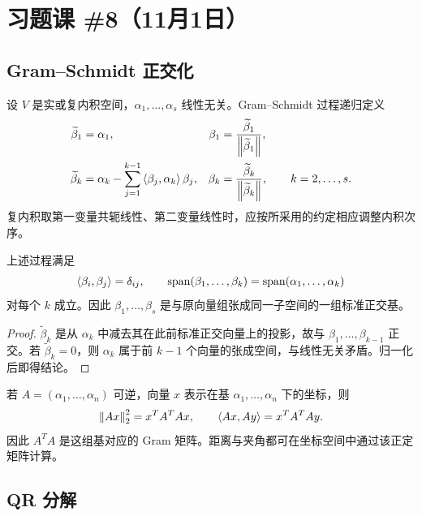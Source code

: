 \section{习题课 \#8（11月1日）}

\subsection{Gram--Schmidt 正交化}

设 $V$ 是实或复内积空间，$\alpha_1,\ldots,\alpha_s$ 线性无关。Gram--Schmidt 过程递归定义
\begin{align}
 \widetilde\beta_1&=\alpha_1,
 &\beta_1&=\frac{\widetilde\beta_1}{\left\lVert \widetilde\beta_1\right\rVert},\\
 \widetilde\beta_k&=\alpha_k-
 \sum_{j=1}^{k-1}\left\langle \beta_j,\alpha_k\right\rangle\beta_j,
 &\beta_k&=\frac{\widetilde\beta_k}{\left\lVert \widetilde\beta_k\right\rVert},
 \qquad k=2,\ldots,s.
\end{align}
复内积取第一变量共轭线性、第二变量线性时，应按所采用的约定相应调整内积次序。

\begin{theorem}
上述过程满足
\begin{equation}
 \left\langle \beta_i,\beta_j\right\rangle=\delta_{ij},
 \qquad
 \operatorname{span}(\beta_1,\ldots,\beta_k)
 =\operatorname{span}(\alpha_1,\ldots,\alpha_k)
\end{equation}
对每个 $k$ 成立。因此 $\beta_1,\ldots,\beta_s$ 是与原向量组张成同一子空间的一组标准正交基。
\end{theorem}

\begin{proof}
$\widetilde\beta_k$ 是从 $\alpha_k$ 中减去其在此前标准正交向量上的投影，故与 $\beta_1,\ldots,\beta_{k-1}$ 正交。若 $\widetilde\beta_k=0$，则 $\alpha_k$ 属于前 $k-1$ 个向量的张成空间，与线性无关矛盾。归一化后即得结论。
\end{proof}

\begin{remark}[由坐标变换诱导的内积]
若 $A=(\alpha_1,\ldots,\alpha_n)$ 可逆，向量 $x$ 表示在基 $\alpha_1,\ldots,\alpha_n$ 下的坐标，则
\begin{equation}
 \left\lVert Ax\right\rVert_2^2=x^TA^TAx,
 \qquad
 \left\langle Ax,Ay\right\rangle=x^TA^TAy.
\end{equation}
因此 $A^TA$ 是这组基对应的 Gram 矩阵。距离与夹角都可在坐标空间中通过该正定矩阵计算。
\end{remark}

\subsection{QR 分解}

